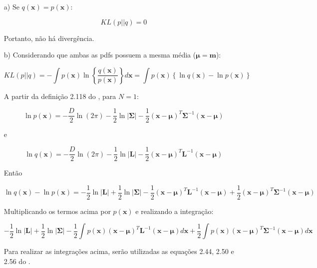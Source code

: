 \documentclass{article}
\begin{document}
   
   \begin{itemize}
   	\item [a)]  Se $q(\textbf{x}) = p(\textbf{x})$:
   	     
   	     \[
   	       KL(p || q) = 0
   	     \]
   	
     Portanto, não há divergência.  	
    	
   	\item [b)] Considerando que ambas as pdfs possuem a mesma média ($\boldsymbol{\mu} = \textbf{m}$):
   	
   	
   	  \[
   	  KL(p || q) = - \int p(\textbf{x}) \ln \left\{\frac{q(\textbf{x})}{p(\textbf{x})}\right\} d\textbf{x} = \int p(\textbf{x}) \left\{ \ln  q(\textbf{x}) - \ln p(\textbf{x}) \right\}
   	  \]
   	   
   	   
   	  A partir da definição 2.118 do \cite{Bishop2006}, para $N=1$:
   	  
   	  \[
   	    \ln p(\mathbf{x}) = - \frac{D}{2} \ln (2\pi) - \frac{1}{2} \ln{|\boldsymbol{\Sigma}|} - \frac{1}{2}(\mathbf{x}-\boldsymbol{\mu})^{T}\boldsymbol{\Sigma}^{-1}(\mathbf{x}-\boldsymbol{\mu})
   	  \] 
   	  
   	  e
   	  
   	   \[
   	  \ln q(\mathbf{x}) = - \frac{D}{2} \ln (2\pi) - \frac{1}{2} \ln{|\mathbf{L}|} - \frac{1}{2}(\mathbf{x}-\boldsymbol{\mu})^{T} \mathbf{L}^{-1}(\mathbf{x}-\boldsymbol{\mu})
   	  \] 
   	  
   	  
   	 Então
   	 
   	 \[
   	 \ln  q(\textbf{x}) - \ln p(\textbf{x}) =  - \frac{1}{2} \ln{|\mathbf{L}|} + \frac{1}{2} \ln{|\boldsymbol{\Sigma}|} -\frac{1}{2}(\mathbf{x}-\boldsymbol{\mu})^{T} \mathbf{L}^{-1}(\mathbf{x}-\boldsymbol{\mu})+ \frac{1}{2}(\mathbf{x}-\boldsymbol{\mu})^{T}\boldsymbol{\Sigma}^{-1}(\mathbf{x}-\boldsymbol{\mu})
   	 \] 
   	 
   	 
   	 Multiplicando os termos acima por $p(\textbf{x})$ e realizando a integração:
   	 
   	 \[
   	     - \frac{1}{2} \ln{|\mathbf{L}|} + \frac{1}{2} \ln{|\boldsymbol{\Sigma}|} -\frac{1}{2}  \int p(\textbf{x})(\mathbf{x}-\boldsymbol{\mu})^{T} \mathbf{L}^{-1}(\mathbf{x}-\boldsymbol{\mu})d\textbf{x}+ \frac{1}{2} \int p(\textbf{x})(\mathbf{x}-\boldsymbol{\mu})^{T}\boldsymbol{\Sigma}^{-1}(\mathbf{x}-\boldsymbol{\mu})d\textbf{x}
   	 \]
   	 
   	 Para realizar as integrações acima, serão utilizadas as equações 2.44, 2.50 e 2.56 do \cite{Bishop2006}.
   	 

\end{itemize}
\end{document}
